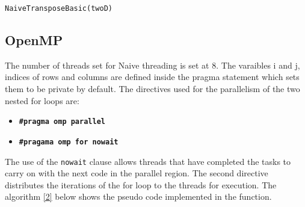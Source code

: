 \documentclass[conference]{IEEEtran}
\begin{document}
\begin{algorithm}




\caption{\texttt{NaiveTransposeBasic(twoD)}}
\label{basic}
\end{algorithm}

\subsection{OpenMP}
The number of threads set for Naive threading is set at 8. The varaibles i and j, indices of rows and  columns are defined inside the pragma statement which sets them to be private by default. The directives used for the parallelism of the two nested for loops are:\\

\begin{itemize}
    \item \texttt{\textbf{\#pragma omp parallel}}
    \item \texttt{\textbf{\#pragama omp for nowait}}
\end{itemize}



The use of the \texttt{nowait} clause allows threads that have completed the tasks to carry on with the next code in the parallel region. The second directive distributes the iterations of the for loop to the threads for execution.  The algorithm \ref{2} below shows the pseudo code implemented in the function.
\end{document}
